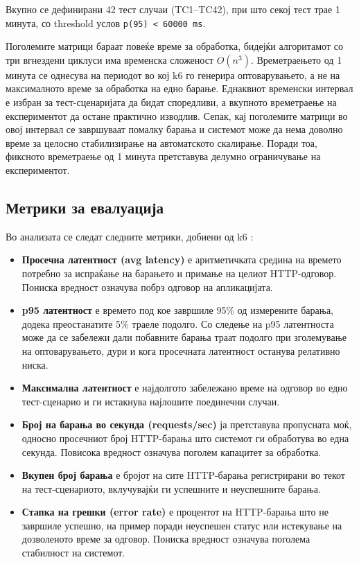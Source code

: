 \documentclass{article}
\begin{document}
Вкупно се дефинирани 42 тест случаи (TC1--TC42), при што секој тест трае 1 минута, со threshold услов \texttt{p(95) < 60000 ms}.

Поголемите матрици бараат повеќе време за обработка, бидејќи алгоритамот со три вгнездени циклуси има временска сложеност $O(n^3)$. Времетраењето од 1 минута се однесува на периодот во кој k6 го генерира оптоварувањето, а не на максималното време за обработка на едно барање. Еднаквиот временски интервал е избран за тест-сценаријата да бидат споредливи, а вкупното времетраење на експериментот да остане практично изводлив. Сепак, кај поголемите матрици во овој интервал се завршуваат помалку барања и системот може да нема доволно време за целосно стабилизирање на автоматското скалирање. Поради тоа, фиксното времетраење од 1 минута претставува делумно ограничување на експериментот.

\subsection{Метрики за евалуација}

Во анализата се следат следните метрики, добиени од k6 \cite{grafanaK6Metrics}:
\begin{itemize}
    \item \textbf{Просечна латентност (avg latency)} е аритметичката средина на времето потребно за испраќање на барањето и примање на целиот HTTP-одговор. Пониска вредност означува побрз одговор на апликацијата.
    \item \textbf{p95 латентност} е времето под кое завршиле 95\% од измерените барања, додека преостанатите 5\% траеле подолго. Со следење на p95 латентноста може да се забележи дали побавните барања траат подолго при зголемување на оптоварувањето, дури и кога просечната латентност останува релативно ниска.
    \item \textbf{Максимална латентност} е најдолгото забележано време на одговор во едно тест-сценарио и ги истакнува најлошите поединечни случаи.
    \item \textbf{Број на барања во секунда (requests/sec)} ја претставува пропусната моќ, односно просечниот број HTTP-барања што системот ги обработува во една секунда. Повисока вредност означува поголем капацитет за обработка.
    \item \textbf{Вкупен број барања} е бројот на сите HTTP-барања регистрирани во текот на тест-сценариото, вклучувајќи ги успешните и неуспешните барања.
    \item \textbf{Стапка на грешки (error rate)} е процентот на HTTP-барања што не завршиле успешно, на пример поради неуспешен статус или истекување на дозволеното време за одговор. Пониска вредност означува поголема стабилност на системот.
\end{itemize}
\end{document}
